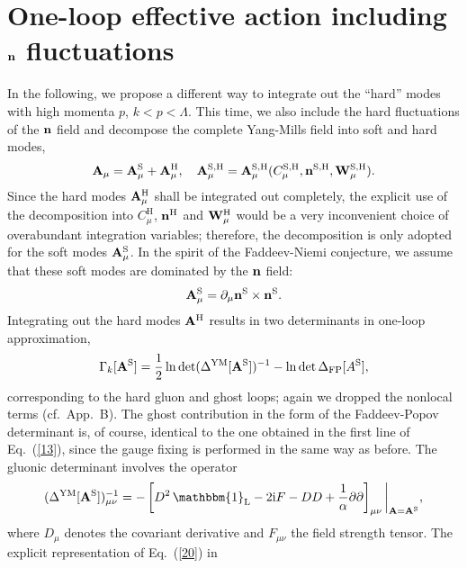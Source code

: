 \documentclass[a4paper,12pt]{article}
\newcommand{\I}{\text{i}}
\newcommand{\re}[1]{~(\ref{#1})}
\begin{document}
\section{One-loop effective action including $\mathbf{n}$ fluctuations}
\label{nfluc}

In the following, we propose a different way to integrate out the
``hard'' modes with high momenta $p$, $k<p<\Lambda$. This time, we
also include the hard fluctuations of the $\mathbf{n}$ field and decompose
the complete Yang-Mills field into soft and hard modes,
\begin{equation}
\mathbf{A}_\mu=\mathbf{A}^{\text{S}}_\mu +\mathbf{A}^{\text{H}}_\mu, \quad 
\mathbf{A}^{\text{S,H}}_\mu=\mathbf{A}^{\text{S,H}}_\mu 
(C^{\text{S,H}}_\mu,\mathbf{n}^{\text{S,H}},\mathbf{W}^{\text{S,H}}_\mu). \label{17}
\end{equation}
Since the hard modes $\mathbf{A}^{\text{H}}_\mu$ shall be integrated out
completely, the explicit use of the decomposition into
$C^{\text{H}}_\mu$, $\mathbf{n}^{\text{H}}$ and $\mathbf{W}^{\text{H}}_\mu$ would be
a very inconvenient choice of overabundant integration
variables; therefore, the decomposition is only adopted for the soft
modes $\mathbf{A}^{\text{S}}_\mu$. In the spirit of the Faddeev-Niemi
conjecture, we assume that these soft modes are dominated by the $\mathbf{n}$
field:
\begin{equation}
\mathbf{A}^{\text{S}}_\mu =\partial_\mu\mathbf{n}^{\text{S}}\times
\mathbf{n}^{\text{S}}. \label{18}
\end{equation}
Integrating out the hard modes $\mathbf{A}^{\text{H}}$ results in two
determinants in one-loop approximation,
\begin{equation}
\Gamma_k[\mathbf{A}^{\text{S}}] =\frac{1}{2} \ln \det
(\Delta^{\text{YM}}[\mathbf{A}^{\text{S}}])^{-1} 
-\ln\det\Delta_{\text{FP}}[A^{\text{S}}], \label{19}
\end{equation}
corresponding to the hard gluon and ghost loops; again we dropped the
nonlocal terms (cf.~App.~B). The ghost contribution in the form of the
Faddeev-Popov determinant is, of course, identical to the one obtained
in the first line of Eq.\re{13}, since the gauge fixing is performed
in the same way as before. The gluonic determinant involves the
operator
\begin{equation}
(\Delta^{\text{YM}}[\mA^{\text{S}}])^{-1}_{\mu\nu} =-\left[ D^2\,
  \mathbbm{1}_{\text{L}}-2\I F-D D+ \frac{1}{\alpha} \partial \partial
  \right]_{\mu\nu} \bigg|_{\mA=\mA^{\text{S}}}, \label{20}
\end{equation} 
where $D_\mu$ denotes the covariant derivative and $F_{\mu\nu}$ the
field strength tensor. The explicit representation of Eq.\re{20} in
\end{document}

